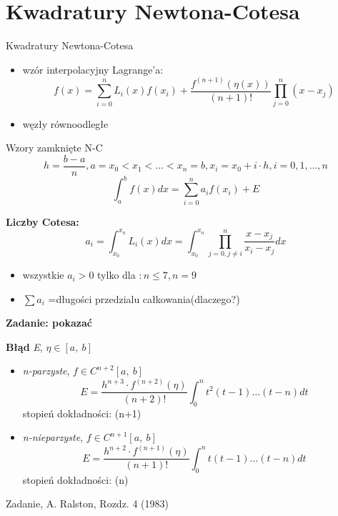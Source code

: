 \section{Kwadratury Newtona-Cotesa}
	\begin{frame}{Kwadratury Newtona-Cotesa}
	
    	\begin{itemize}
    	\item wzór interpolacyjny Lagrange'a:
        \[
        f(x)=\sum_{i=0}^{n}L_{i}(x)f(x_{i})+\frac{f^{(n+1)}(\eta(x))}{(n+1)!}\prod_{j=0}^{n}(x-x_{j})
        \]
        \item węzły równoodległe
    	\end{itemize}
	\end{frame}
	\begin{frame}{Wzory zamknięte N-C}
    	$$
        h=\frac{b-a}{n}, a=x_{0}<x_{1}<\ldots<x_{n}=b, x_{i}=x_{0}+i\cdot h, i=0, 1, \ldots , n
        $$
          $$
\int_{a}^{b}f(x)dx=\sum_{i=0}^{n}a_{i}f(x_{i})+E
          $$
		
        \textbf{Liczby Cotesa:}
          $$
a_{i}=\int_{x_{0}}^{x_{n}}L_{i}(x)dx=\int_{x_{0}}^{x_{n}}\prod_{j=0,j\neq i}^{n}\frac{x-x_{j}}{x_{i}-x_{j}}dx
          $$
          \begin{itemize}
          \item wszystkie $a_{i}>0$ tylko dla $:n\leq 7, n=9$
          \item $\sum a_{i}$ =długości przedzialu całkowania(dlaczego?)
          \end{itemize}
         \begin{flushright}
         	\textbf{Zadanie: pokazać}
         \end{flushright}
    
	\end{frame}
	\begin{frame}
    	\textbf{Błąd} \textit{E}, $\eta\in[a,\ b]$ \newline
        \begin{itemize}
        \item \textit{n-parzyste}, $f\in C^{n+2}[a,\ b]$
        $$
 		E= \frac{h^{n+3}\cdot f^{(n+2)}(\eta)}{(n+2)!}\int_{0}^{n}t^{2}(t-1)\ldots(t-n)dt
 		$$
        stopień dokładności: (n+1) 
        \item \textit{n-nieparzyste}, $f\in C^{n+1}[a,\ b]$
        $$
		E=\frac{h^{n+2}\cdot f^{(n+1)}(\eta)}{(n+1)!}\int_{0}^{n}t(t-1)\ldots(t-n)dt
 		$$
        stopień dokładności: (n)
        \end{itemize}
        \begin{flushright}
         	Zadanie, A. Ralston, Rozdz. 4 (1983)
        \end{flushright}
	\end{frame}
